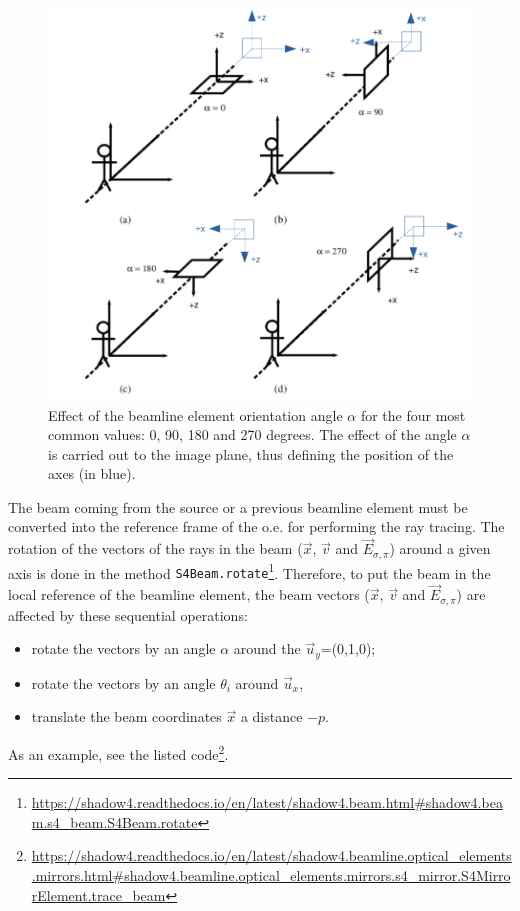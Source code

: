 \documentclass{iucr}
\begin{document}
\begin{figure}
\label{fig:S4_orientations}
    \centering
\includegraphics[width=0.9\linewidth]{figures/S4_orientations.png}
\caption{Effect of the beamline element orientation angle $\alpha$ for the four most common values: 0, 90, 180 and 270 degrees. The effect of the angle $\alpha$ is carried out to the image plane, thus defining the position of the axes (in blue). }  
\end{figure}


The beam coming from the source or a previous beamline element must be converted into the reference frame of the o.e. for performing the ray tracing.
The rotation of the vectors of the rays in the beam ($\vec{x}$, $\vec{v}$ and $\vec{E}_{\sigma,\pi}$) around a given axis is done in the method {\tt S4Beam.rotate}\footnote{\tiny \url{https://shadow4.readthedocs.io/en/latest/shadow4.beam.html#shadow4.beam.s4_beam.S4Beam.rotate}}. 
Therefore, to put the beam in the local reference of the beamline element, the beam vectors ($\vec{x}$,  $\vec{v}$ and $\vec{E}_{\sigma,\pi}$) are affected by these sequential operations:
\begin{itemize}
    \item rotate the vectors by an angle $\alpha$ around the $\vec{u}_y$=(0,1,0); 
    \item rotate the vectors by an angle $\theta_i$ around $\vec{u}_x$,
    \item translate the beam coordinates $\vec{x}$ a distance $-p$.
\end{itemize}
As an example, see the listed code\footnote{\tiny \url{https://shadow4.readthedocs.io/en/latest/shadow4.beamline.optical_elements.mirrors.html#shadow4.beamline.optical_elements.mirrors.s4_mirror.S4MirrorElement.trace_beam}}.
\end{document}
